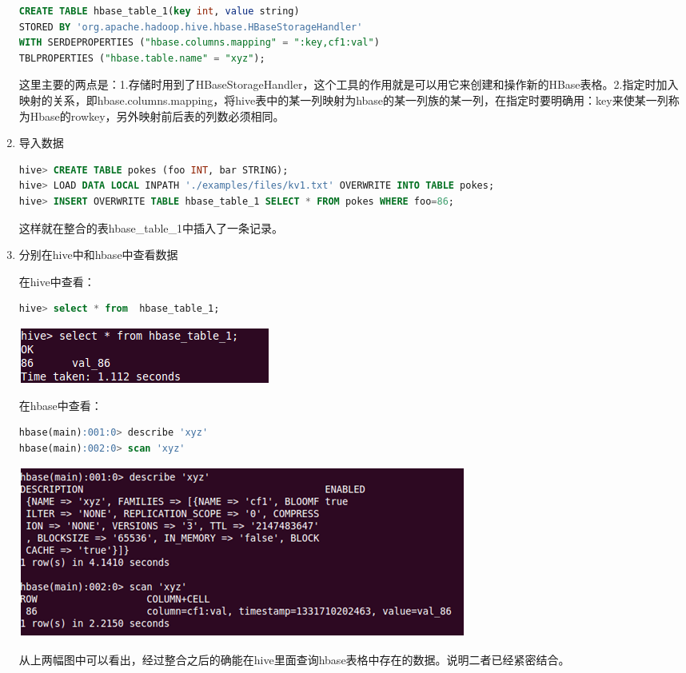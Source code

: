 \begin{enumerate}
\begin{lstlisting}[language=SQL]
CREATE TABLE hbase_table_1(key int, value string)  
STORED BY 'org.apache.hadoop.hive.hbase.HBaseStorageHandler'  
WITH SERDEPROPERTIES ("hbase.columns.mapping" = ":key,cf1:val")  
TBLPROPERTIES ("hbase.table.name" = "xyz");
\end{lstlisting}


这里主要的两点是：1.存储时用到了HBaseStorageHandler，这个工具的作用就是可以用它来创建和操作新的HBase表格。2.指定时加入映射的关系，即hbase.columns.mapping，将hive表中的某一列映射为hbase的某一列族的某一列，在指定时要明确用：key来使某一列称为Hbase的rowkey，另外映射前后表的列数必须相同。

\item 导入数据

\begin{lstlisting}[language=SQL]
hive> CREATE TABLE pokes (foo INT, bar STRING); 
hive> LOAD DATA LOCAL INPATH './examples/files/kv1.txt' OVERWRITE INTO TABLE pokes;
hive> INSERT OVERWRITE TABLE hbase_table_1 SELECT * FROM pokes WHERE foo=86;
\end{lstlisting}

这样就在整合的表hbase\_table\_1中插入了一条记录。

\item 分别在hive中和hbase中查看数据

在hive中查看：
\begin{lstlisting}[language=SQL]
hive> select * from  hbase_table_1;
\end{lstlisting}

\includegraphics[]{photo/integration-hive.png}

在hbase中查看：
\begin{lstlisting}[language=SQL]
hbase(main):001:0> describe 'xyz'   
hbase(main):002:0> scan 'xyz'
\end{lstlisting}

\includegraphics[]{photo/integration-hbase.png}

  从上两幅图中可以看出，经过整合之后的确能在hive里面查询hbase表格中存在的数据。说明二者已经紧密结合。
\end{enumerate}


